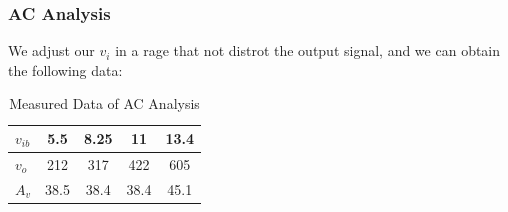     \subsubsection{AC Analysis}
    We adjust our $v_i$ in a rage that not distrot the output signal, and we can obtain the following data:
    \begin{table}[H]
        \centering
            \begin{tabular}{|l|cccc|}
            \hline
            $v_{ib}$ & 5.5  & 8.25 & 11   & 13.4 \\ \hline
            $v_o$    & 212  & 317  & 422  & 605  \\ \hline
            $A_v$    & 38.5 & 38.4 & 38.4 & 45.1 \\ \hline
        \end{tabular}
        \caption{Measured Data of AC Analysis}
    \end{table}

